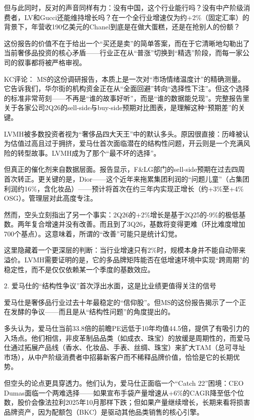 \documentclass[11pt]{ctexart}
\begin{document}
但与此同时，反对的声音同样有力：没有中国，这个行业能行吗？没有中产阶级消费者，LV和Gucci还能维持增长吗？在一个全行业增速仅为约+2\%（固定汇率）的背景下，年营收190亿美元的Chanel到底是在做大蛋糕，还是在抢别人的份额？

这份报告的价值不在于给出一个“买还是卖”的简单答案，而在于它清晰地勾勒出了当前奢侈品投资的核心矛盾——行业正在从“普涨”切换到“精选”阶段，而每一家公司的叙事都将被严格审视。

KC评论： MS的这份调研报告，本质上是一次对“市场情绪温度计”的精确测量。它告诉我们，华尔街的机构资金正在从“全面回避”转向“选择性下注”。但这个选择的标准非常苛刻——不再是“谁的故事好听”，而是“谁的数据能兑现”。完整报告里关于各家公司2Q26的sell-side与buy-side预期对比图表，是理解这种“预期差”的关键。

LVMH被多数投资者视为“奢侈品四大天王”中的默认多头。原因很直接：历峰被认为估值过高且过于拥挤，爱马仕首次面临潜在的结构性问题，开云则是一个充满风险的转型故事。LVMH成为了那个“最不坏的选择”。

但真正的催化剂来自数据层面。报告显示，F\&LG部门的sell-side预期在过去四周首次转正。更关键的是，Dior——这个近年来拖累集团利润的“问题儿童”（占集团利润约16\%，含化妆品）——预计将首次在约三年内实现正增长（约+3\%至+4\% OSG）。管理层对此高度专注。

然而，空头立刻指出了另一个事实：2Q26的+2\%增长是基于2Q25的-9\%的极低基数。两年复合增速并没有改善。而且到了3Q26，基数将变得更难（环比难度增加700个基点）。这意味着，所谓的“改善”可能只是统计幻觉。

这里隐藏着一个更深层的判断：当行业增速只有2\%时，规模本身并不能自动带来溢价。LVMH需要证明的是，它的多品牌矩阵能否在低增速环境中实现“跨周期”的稳定性，而不是仅仅依赖某一个季度的基数效应。

2. 爱马仕的“结构性争议”首次浮出水面，这是比业绩更值得关注的信号

爱马仕是奢侈品行业过去十年最稳定的“信仰股”。但MS的这份报告揭示了一个正在发酵的争议——而且是从“结构性问题”的角度提出的。

多头认为，爱马仕当前33.8倍的前瞻PE远低于10年均值44.5倍，提供了有吸引力的入场点。他们相信，非皮革制品品类（如成衣、珠宝）的放缓是周期性的，而爱马仕通过拓展产品线（香水、化妆品、手表、丝绸、珠宝）来扩大TAM（总可寻址市场），从中产阶级消费者中招募新客户而不稀释品牌价值，恰恰是它的长期优势。

但空头的论点更具穿透力。他们认为，爱马仕正面临一个“Catch 22”困境：CEO Dumas面临一个两难选择——如果宣布手袋产量增速从+6\%的CAGR降至低个位数，股价会像法拉利2025年10月那样下跌；但如果产量继续增长，长期来看将损害品牌资产，因为配额包（BKC）是驱动其他品类销售的核心引擎。
\end{document}
